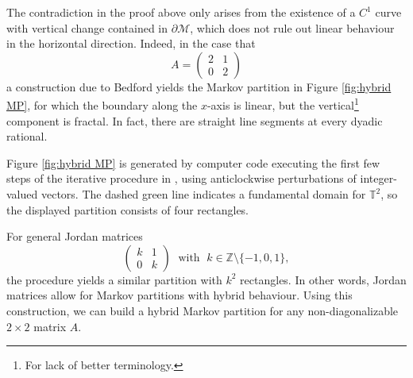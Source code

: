 \documentclass{article}
\def\Z{\mathbb{Z}}
\def\T{\mathbb{T}}
\def\M{\mathcal{M}}
\begin{document}
The contradiction in the proof above only arises from the existence of a $C^1$ curve with vertical change contained in $\partial \M$, which does not rule out linear behaviour in the horizontal direction. Indeed, in the case that $$A=\begin{pmatrix}
        2 & 1 \\ 0 & 2
\end{pmatrix}$$ a construction due to Bedford \cite{Be} yields the Markov partition in Figure \ref{fig:hybrid MP}, for which the boundary along the $x$-axis is linear, but the vertical\footnote{For lack of better terminology.} component is fractal. In fact, there are straight line segments at every dyadic rational.

Figure \ref{fig:hybrid MP} is generated by computer code executing the first few steps of the iterative procedure in \cite{Be}, using anticlockwise perturbations of integer-valued vectors. The dashed green line indicates a fundamental domain for $\T^2$, so the displayed partition consists of four rectangles. 

For general Jordan matrices $$\begin{pmatrix}
    k & 1 \\ 0 & k
\end{pmatrix} \;\text{ with }\; k\in \Z\setminus \{-1,0,1\},$$ the procedure yields a similar partition with $k^2$ rectangles. In other words, Jordan matrices allow for Markov partitions with hybrid behaviour. Using this construction, we can build a hybrid Markov partition for any non-diagonalizable $2\times 2$ matrix $A$.
\end{document}
